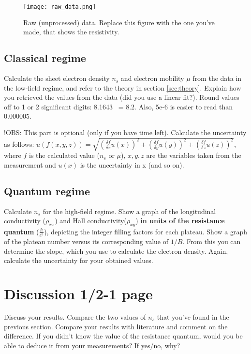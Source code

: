 \documentclass[a4paper]{article}
\begin{document}
\begin{figure}
\centering
\texttt{[image: raw\_data.png]}
\caption{\label{fig:data}Raw (unprocessed) data. Replace this figure with the one you've made, that shows the resistivity.}
\end{figure}

\subsection{Classical regime}
Calculate the sheet electron density $n_{s}$ and electron mobility $\mu$ from the data in the low-field regime, and refer to the theory in section \ref{sec:theory}. Explain how you retrieved the values from the data (did you use a linear fit?).
Round values off to 1 or 2 significant digits: 8.1643 ~= 8.2. Also, 5e-6 is easier to read than 0.000005.

!OBS: This part is optional (only if you have time left).
Calculate the uncertainty as follows: \newline $u(f(x, y, z)) = \sqrt{(\frac{\delta f}{\delta{x}} u(x))^{2} + (\frac{\delta f}{\delta{y}} u(y))^{2} + (\frac{\delta f}{\delta{z}} u(z))^{2}}$, where $f$ is the calculated value ($n_{s}$ or $\mu$), $x, y, z$ are the variables taken from the measurement and $u(x)$ is the uncertainty in x (and so on).

\subsection{Quantum regime}
Calculate $n_{s}$ for the high-field regime.
Show a graph of the longitudinal conductivity ($\rho_{xx}$) and Hall conductivity($\rho_{xy}$) \textbf{in units of the resistance quantum} ($\frac{h}{e^{2}}$), depicting the integer filling factors for each plateau.
Show a graph of the plateau number versus its corresponding value of $1/B$. From this you can determine the slope, which you use to calculate the electron density.
Again, calculate the uncertainty for your obtained values.

\section{Discussion 1/2-1 page}
Discuss your results. Compare the two values of $n_{s}$ that you've found in the previous section. Compare your results with literature and comment on the difference. If you didn't know the value of the resistance quantum, would you be able to deduce it from your measurements? If yes/no, why?
\end{document}
